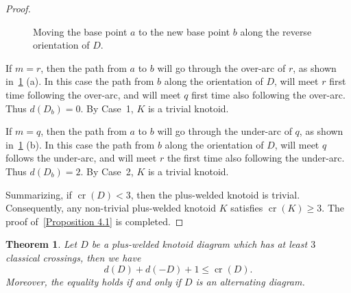 \documentclass[11pt]{amsart}
\theoremstyle{noparens}
\newtheorem{theorem}{Theorem}[section]
\numberwithin{equation}{section}
\numberwithin{equation}{section}
\begin{document}
\begin{proof}
\begin{figure}[htbp]
\begin{center}
\caption{Moving the base point $a$ to the new base point $b$ along the reverse orientation of $D$.}		
\label{Figure 23}
\end{center}
\end{figure}
	
If $m = r$, then the path from $a$ to $b$ will go through the over-arc of $r$, as shown in~\cref{Figure 23} (a). In this case the path from $b$ along the orientation of $D$, will meet $r$ first time following the over-arc, and will meet $q$ first time also following  the over-arc. Thus $d(D_b) = 0$. By Case~1, $K$ is a trivial knotoid.
	
If $m = q$, then the path from $a$ to $b$ will go through the under-arc of $q$, as shown in~\cref{Figure 23} (b). In this case the path from $b$ along the orientation of $D$, will meet $q$ follows the under-arc, and will meet $r$ the first time  also following the under-arc. Thus $d(D_b) = 2$. By Case~2, $K$ is a trivial knotoid. 

Summarizing, if $\operatorname{cr}(D)<3$, then the plus-welded knotoid is trivial. Consequently, any non-trivial plus-welded knotoid $K$ satisfies $\operatorname{cr}(K)\geq3$. The proof of~\cref{Proposition 4.1} is completed. 
\end{proof}

\begin{theorem} \label{Theorem 4.1}
Let $D$ be a plus-welded knotoid diagram which has at least $3$ classical crossings, then we have
\begin{equation} \label{equation 4.3}
d(D) + d(-D) + 1 \leq \operatorname{cr}(D).
\end{equation}
Moreover, the equality holds if and only if $D$ is an alternating diagram.
\end{theorem}
\end{document}
